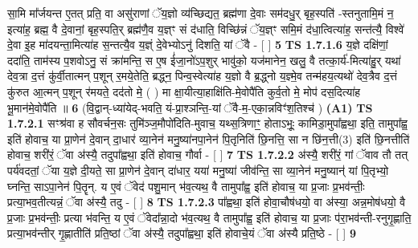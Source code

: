 \documentclass[17pt]{extarticle}
\begin{document}
                  सा॒मि मा᳚र्जयन्त ए॒तत् प्रति॒ वा असु॑राणां ॅय॒ज्ञो व्य॑च्छिद्यत॒ ब्रह्म॑णा दे॒वाः सम॑दधु॒र् बृह॒स्पति॑ -स्तनुतामि॒मं न॒ इत्या॑ह॒ ब्रह्म॒ वै दे॒वानां॒ बृह॒स्पति॒र् ब्रह्म॑णै॒व य॒ज्ञ्ꣳ सं द॑धाति॒ विच्छि॑न्नं ॅय॒ज्ञ्ꣳ समि॒मं द॑धा॒त्वित्या॑ह॒ सन्त॑त्यै॒ विश्वे॑ दे॒वा इ॒ह मा॑दयन्ता॒मित्या॑ह स॒न्तत्यै॒व य॒ज्ञ्ं दे॒वेभ्योऽनु॑ दिशति॒ यां ॅवै - [ ] \textbf{  5} \newline
                  \newline
                                \textbf{ TS 1.7.1.6} \newline
                  य॒ज्ञे दक्षि॑णां॒ ददा॑ति॒ ताम॑स्य प॒शवोऽनु॒ सं क्रा॑मन्ति॒ स ए॒ष ई॑जा॒नो॑ऽप॒शुर् भावु॑को॒ यज॑मानेन॒ खलु॒ वै तत्का॒र्य॑-मित्या॑हु॒र् यथा॑ देव॒त्रा द॒त्तं कु॑र्वी॒तात्मन् प॒शून् र॒मये॒तेति॒ ब्रद्ध्न॒ पिन्व॒स्वेत्या॑ह य॒ज्ञो वै ब्र॒द्ध्नो य॒ज्ञ्मे॒व तन्म॑हय॒त्यथो॑ देव॒त्रैव द॒त्तं कु॑रुत आ॒त्मन् प॒शून् र॑मयते॒ दद॑तो मे॒ ( ) मा क्षा॒यीत्या॒हाक्षि॑ति-मे॒वोपै॑ति कुर्व॒तो मे॒ मोप॑ दस॒दित्या॑ह भू॒मान॑मे॒वोपै॑ति ॥ \textbf{  6 } \newline
                  \newline
                      (वि॒द्वान्-ध्या॑येद्-भवति॒ यं-प्रा॒श्ञन्ति॒-यां ॅवै-म॒-एका॒न्नविꣳ॑श॒तिश्च॑ )  \textbf{(A1)} \newline \newline
                                        \textbf{ TS 1.7.2.1} \newline
                  सꣳश्र॑वा ह सौवर्चन॒सः तुमि॑ञ्ज॒मौपो॑दिति-मुवाच॒ यथ्स॒त्रिणाꣳ॒॒ होताऽभूः॒ कामिडा॒मुपा᳚ह्वथा॒ इति॒ तामुपा᳚ह्व॒ इति॑ होवाच॒ या प्रा॒णेन॑ दे॒वान् दा॒धार॑ व्या॒नेन॑ मनु॒ष्या॑नपा॒नेन॑ पि॒तृनिति॑ छि॒नत्ति॒ सा न छि॑न॒त्ती(3) इति॑ छि॒नत्तीति॑ होवाच॒ शरी॑रं॒ ॅवा अ॑स्यै॒ तदुपा᳚ह्वथा॒ इति॑ होवाच॒ गौर्वा - [ ] \textbf{  7} \newline
                  \newline
                                \textbf{ TS 1.7.2.2} \newline
                  अ॑स्यै॒ शरी॑रं॒ गां ॅवाव तौ तत् पर्य॑वदतां॒ ॅया य॒ज्ञे दी॒यते॒ सा प्रा॒णेन॑ दे॒वान् दा॑धार॒ यया॑ मनु॒ष्या॑ जीव॑न्ति॒ सा व्या॒नेन॑ मनु॒ष्यान्॑ यां पि॒तृभ्यो॒ घ्नन्ति॒ साऽपा॒नेन॑ पि॒तॄन्. य ए॒वं ॅवेद॑ पशु॒मान् भ॑व॒त्यथ॒ वै तामुपा᳚ह्व॒ इति॑ होवाच॒ या प्र॒जाः प्र॒भव॑न्तीः॒ प्रत्या॒भव॒तीत्यन्नं॒ ॅवा अ॑स्यै॒ तदु - [ ] \textbf{  8} \newline
                  \newline
                                \textbf{ TS 1.7.2.3} \newline
                  पा᳚ह्वथा॒ इति॑ होवा॒चौष॑धयो॒ वा अ॑स्या॒ अन्न॒मोष॑धयो॒ वै प्र॒जाः प्र॒भव॑न्तीः॒ प्रत्या भ॑वन्ति॒ य ए॒वं ॅवेदा᳚न्ना॒दो भ॑व॒त्यथ॒ वै तामुपा᳚ह्व॒ इति॑ होवाच॒ या प्र॒जाः प॑रा॒भव॑न्ती-रनुगृ॒ह्णाति॒ प्रत्या॒भव॑न्तीर् गृ॒ह्णातीति॑ प्रति॒ष्ठां ॅवा अ॑स्यै॒ तदुपा᳚ह्वथा॒ इति॑ होवाचे॒यं ॅवा अ॑स्यै प्रति॒ष्ठे - [ ] \textbf{  9} \newline
\end{document}
